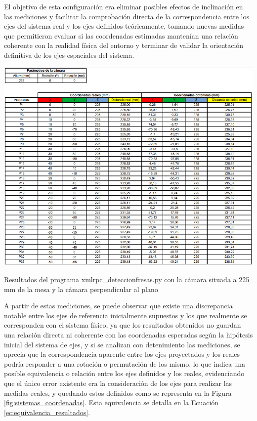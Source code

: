 El objetivo de esta configuración era eliminar posibles efectos de inclinación en las mediciones y facilitar la comprobación directa de la correspondencia entre los ejes del sistema real y los ejes definidos teóricamente, tomando nuevas medidas que permitieron evaluar si las coordenadas estimadas mantenían una relación coherente con la realidad física del entorno y terminar de validar la orientación definitiva de los ejes espaciales del sistema.

  \begin{table}[H]
     \centering
     \begin{center}
       \includegraphics[width=155mm]{figs/Resultados 225 mm 0 grados.png}
     \end{center}
     \caption{Resultados del programa xmlrpc\_deteccionfresas.py con la cámara situada a 225 mm de la mesa y la cámara perpendicular al plano}
     \label{tab:resultados_180mm_58grados}
  \end{table}

A partir de estas mediciones, se puede observar que existe una discrepancia notable entre los ejes de referencia inicialmente supuestos y los que realmente se corresponden con el sistema físico, ya que los resultados obtenidos no guardan una relación directa ni coherente con las coordenadas esperadas según la hipótesis inicial del sistema de ejes, y si se analizan con detenimiento las mediciones, se aprecia que la correspondencia aparente entre los ejes proyectados y los reales podría responder a una rotación o permutación de los mismo, lo que indica una posible equivalencia o relación entre los ejes definidos y los reales, evidenciando que el único error existente era la consideración de los ejes para realizar las medidas reales, y quedando estos definidos como se representa en la Figura \ref{fig:sistemas_coordenadas}. Esta equivalencia se detalla en la Ecuación \ref{ec:equivalencia_resultados}.


